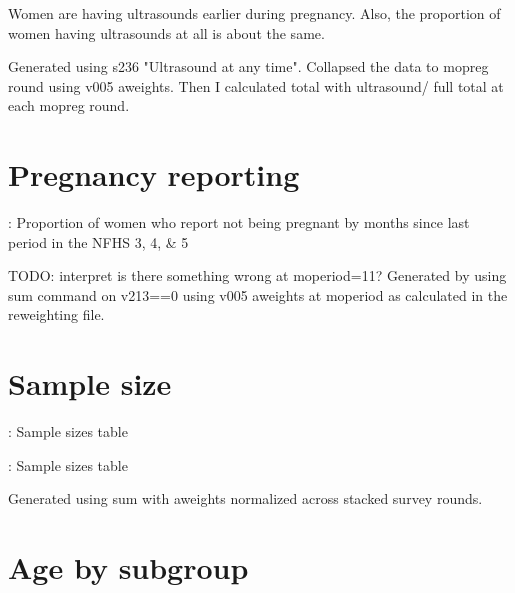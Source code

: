 \documentclass{article}
\begin{document}
Women are having ultrasounds earlier during pregnancy. Also, the proportion of women having ultrasounds at all is about the same.

Generated using s236 "Ultrasound at any time".
Collapsed the data to mopreg round using v005 aweights. 
Then I calculated total with ultrasound/ full total at each mopreg round.

\section{Pregnancy reporting}

\begin{table}[H]
    \centering
    \caption{: Proportion of women who report not being pregnant by months since last period in the NFHS 3, 4, \& 5}
    \label{tab:sumstat}
\end{table}


TODO: interpret 
is there something wrong at moperiod=11?
Generated by using sum command on v213==0 using v005 aweights at moperiod as calculated in the reweighting file. 


\section{Sample size}

\begin{table}[H]
    \centering
    \setlength{\tabcolsep}{4pt} %
    \footnotesize %
    \caption{: Sample sizes table}
    \label{tab:sumstat}
    \begin{adjustbox}{width=\textwidth}
        
    \end{adjustbox}
\end{table}



\begin{table}[H]
    \centering
    \setlength{\tabcolsep}{4pt} %
    \footnotesize %
    \caption{: Sample sizes table}
    \label{tab:sumstat}
    \begin{adjustbox}{width=\textwidth}
        
    \end{adjustbox}
\end{table}

Generated using sum with aweights normalized across stacked survey rounds.

\section{Age by subgroup}
\end{document}
